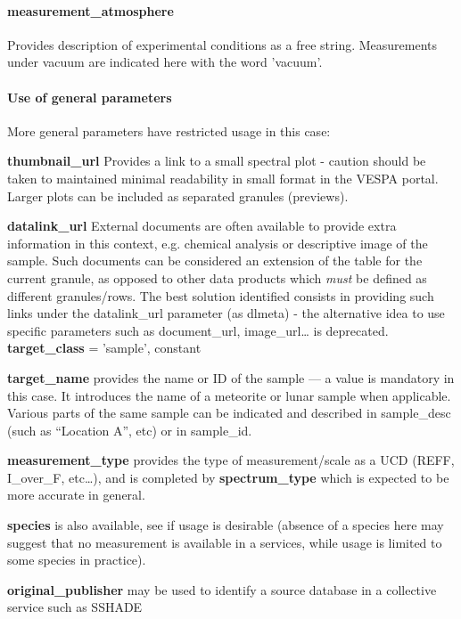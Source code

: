 \documentclass[11pt,a4paper]{ivoa}
\begin{document}
\paragraph{measurement\_atmosphere}

Provides description of experimental conditions as a free string. Measurements under vacuum are indicated here with the word 'vacuum'.

\paragraph{Use of general parameters}

More general parameters have restricted usage in this case:

\textbf{thumbnail\_url }Provides a link to a small spectral plot - caution should be taken to maintained minimal readability in small format in the VESPA portal. Larger plots can be included as separated granules (previews).

\textbf{datalink\_url} External documents are often available to provide extra information in this context, e.g. chemical analysis or descriptive image of the sample. Such documents can be considered an extension of the table for the current granule, as opposed to other data products which \emph{must} be defined as different granules/rows. The best solution identified consists in providing such links under the datalink\_url parameter (as dlmeta)  - the alternative idea to use specific parameters such as document\_url, image\_url… is deprecated.\\

\textbf{target\_class }= 'sample', constant

\textbf{target\_name }provides the name or ID of the sample — a value is mandatory in this case. It introduces the name of a meteorite or lunar sample when applicable. Various parts of the same sample can be indicated and described in sample\_desc (such as ``Location A'', etc) or in sample\_id.

\textbf{measurement\_type} provides the type of measurement/scale as a UCD (REFF, I\_over\_F, etc…), and is completed by \textbf{spectrum\_type} which is expected to be more accurate in general.

\textbf{species} is also available, see if usage is desirable (absence of a species here may suggest that no measurement is available in a services, while usage is limited to some species in practice).

\textbf{original\_publisher }may be used to identify a source database in a collective service such as SSHADE
\end{document}
